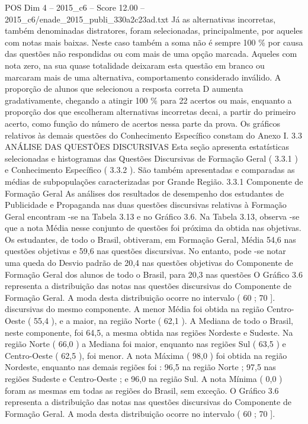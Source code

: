 \begin{textsample}{POS Dim 4 – 2015\_c6 – Score 12.00 – 2015\_c6/enade\_2015\_publi\_330a2c23ad.txt}
Já as alternativas incorretas, também denominadas distratores, foram selecionadas, principalmente, por aqueles com notas mais baixas.
Neste caso também a soma não é sempre 100 \% por causa das questões não respondidas ou com mais de uma opção marcada.
Aqueles com nota zero, na sua quase totalidade deixaram esta questão em branco ou marcaram mais de uma alternativa, comportamento considerado inválido.
A proporção de alunos que selecionou a resposta correta D aumenta gradativamente, chegando a atingir 100 \% para 22 acertos ou mais, enquanto a proporção dos que escolheram alternativas incorretas decai, a partir do primeiro acerto, como função do número de acertos nessa parte da prova.
Os gráficos relativos às demais questões do Conhecimento Específico constam do Anexo I. 3.3 ANÁLISE DAS QUESTÕES DISCURSIVAS Esta seção apresenta estatísticas selecionadas e histogramas das Questões Discursivas de Formação Geral ( 3.3.1 ) e Conhecimento Específico ( 3.3.2 ).
São também apresentadas e comparadas as médias de subpopulações caracterizadas por Grande Região. 3.3.1 Componente de Formação Geral As análises dos resultados de desempenho dos estudantes de Publicidade e Propaganda nas duas questões discursivas relativas à Formação Geral encontram -se na Tabela 3.13 e no Gráfico 3.6.
Na Tabela 3.13, observa -se que a nota Média nesse conjunto de questões foi próxima da obtida nas objetivas.
Os estudantes, de todo o Brasil, obtiveram, em Formação Geral, Média 54,6 nas questões objetivas e 59,6 nas questões discursivas.
No entanto, pode -se notar uma queda do Desvio padrão de 20,4 nas questões objetivas do Componente de Formação Geral dos alunos de todo o Brasil, para 20,3 nas questões O Gráfico 3.6 representa a distribuição das notas nas questões discursivas do Componente de Formação Geral.
A moda desta distribuição ocorre no intervalo ( 60 ; 70 ]. discursivas do mesmo componente.
A menor Média foi obtida na região Centro-Oeste ( 55,4 ), e a maior, na região Norte ( 62,1 ).
A Mediana de todo o Brasil, neste componente, foi 64,5, a mesma obtida nas regiões Nordeste e Sudeste.
Na região Norte ( 66,0 ) a Mediana foi maior, enquanto nas regiões Sul ( 63,5 ) e Centro-Oeste ( 62,5 ), foi menor.
A nota Máxima ( 98,0 ) foi obtida na região Nordeste, enquanto nas demais regiões foi : 96,5 na região Norte ; 97,5 nas regiões Sudeste e Centro-Oeste ; e 96,0 na região Sul.
A nota Mínima ( 0,0 ) foram as mesmas em todas as regiões do Brasil, sem exceção.
O Gráfico 3.6 representa a distribuição das notas nas questões discursivas do Componente de Formação Geral.
A moda desta distribuição ocorre no intervalo ( 60 ; 70 ].

\end{textsample}
